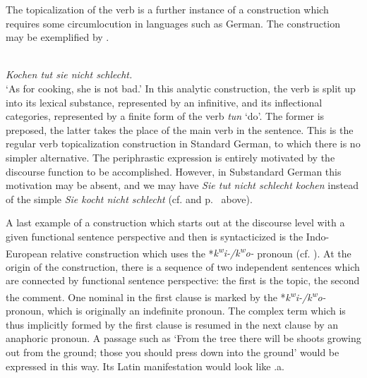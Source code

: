 The topicalization of the verb is a further instance of a construction which requires some circumlocution in languages such as German. The construction may be exemplified by .

\ea \label{ex:E95}
\langinfo{\LangGerm}\\
{\itshape Kochen tut sie nicht schlecht.}\\
\glt ‘As for cooking, she is not bad.’
\z
\noindent In this analytic construction, the verb is split up into its lexical substance, represented by an infinitive, and its inflectional categories, represented by a finite form of the verb \textit{tun} ‘do’. The former is preposed, the latter takes the place of the main verb in the sentence. This is the regular verb topicalization construction in Standard German, to which there is no simpler alternative. The periphrastic expression is entirely motivated by the discourse function to be accomplished.\label{page123} However, in Substandard German this motivation may be absent, and we may have \textit{Sie tut nicht schlecht kochen} instead of the simple \textit{Sie kocht nicht schlecht} (cf. \citealt[156]{Ronneberger-Sibold1980} and p.~\pageref{page35}\chk%
  above).

A last example of a construction which starts out at the discourse level with a given functional sentence perspective and then is syntacticized is the Indo-European relative construction which uses the *\textit{k}\textit{\textsuperscript{w}}\textit{i-/k}\textit{\textsuperscript{w}}\textit{o-} pronoun (cf. \citealt[Ch. \textsc{vi}.1]{Lehmann1984}). At the origin of the construction, there is a sequence of two independent sentences which are connected by functional sentence perspective: the first is the topic, the second the comment. One nominal in the first clause is marked by the *\textit{k}\textit{\textsuperscript{w}}\textit{i-/k}\textit{\textsuperscript{w}}\textit{o-} pronoun, which is originally an indefinite pronoun. The complex term which is thus implicitly formed by the first clause  is resumed in the next clause by an anaphoric pronoun. A passage such as ‘From the tree there will be shoots growing out from the ground; those you should press down into the ground’ would be expressed in this way. Its Latin manifestation would look like .a.

